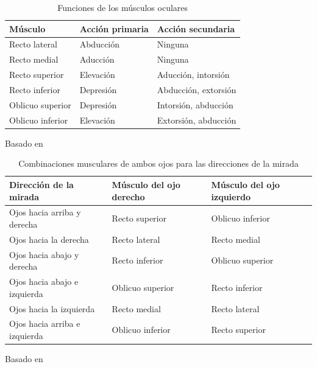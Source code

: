 \documentclass[12pt]{book}
\begin{document}
\begin{table}[htbp]
\centering
\caption{Funciones de los músculos oculares}
\label{tab:13}
\begin{tabularx}{\textwidth}{lXX}
\toprule
\textbf{Músculo} & \textbf{Acción primaria} & \textbf{Acción secundaria} \\
\midrule
Recto lateral & Abducción & Ninguna \\
Recto medial & Aducción & Ninguna \\
Recto superior & Elevación & Aducción, intorsión \\
Recto inferior & Depresión & Abducción, extorsión \\
Oblicuo superior & Depresión & Intorsión, abducción \\
Oblicuo inferior & Elevación & Extorsión, abducción \\
\bottomrule
\end{tabularx}
\begin{flushleft}
    \small Basado en \cite{38}
\end{flushleft}
\end{table}

\begin{table}[htbp]
\centering
\caption{Combinaciones musculares de ambos ojos para las direcciones de la mirada}
\label{tab:14}
\begin{tabularx}{\textwidth}{XXX}
\toprule
\textbf{Dirección de la mirada} & \textbf{Músculo del ojo derecho} & \textbf{Músculo del ojo izquierdo} \\
\midrule
Ojos hacia arriba y derecha & Recto superior & Oblicuo inferior \\
Ojos hacia la derecha & Recto lateral & Recto medial \\
Ojos hacia abajo y derecha & Recto inferior & Oblicuo superior \\
Ojos hacia abajo e izquierda & Oblicuo superior & Recto inferior \\
Ojos hacia la izquierda & Recto medial & Recto lateral \\
Ojos hacia arriba e izquierda & Oblicuo inferior & Recto superior \\
\bottomrule
\end{tabularx}
\begin{flushleft}
    \small Basado en \cite{38}
\end{flushleft}
\end{table}

\end{document}
